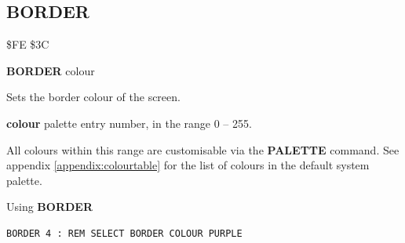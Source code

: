 
\newpage
\subsection{BORDER}
\begin{description}[leftmargin=2cm,style=nextline]
\item [Token:]   \$FE \$3C

\item [Format:]  {\bf BORDER} colour

\item [Usage:]   Sets the border colour of the screen.

                 {\bf colour} palette entry number, in the range 0 -- 255.

                 All colours within this range are customisable via the {\bf PALETTE} command. See appendix \vref{appendix:colourtable} for the list of colours in the default system palette.

\item [Example:] Using {\bf BORDER}

\begin{tcolorbox}[colback=black,coltext=white]
\verbatimfont{\codefont}
\begin{verbatim}
BORDER 4 : REM SELECT BORDER COLOUR PURPLE
\end{verbatim}
\end{tcolorbox}
\end{description}


\newpage
